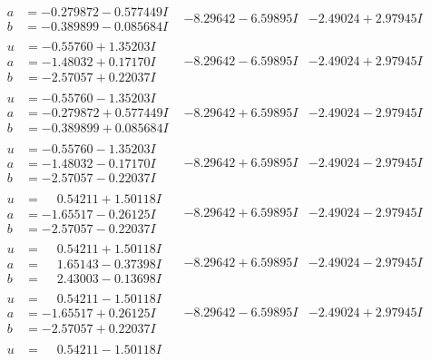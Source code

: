 \documentclass[1p]{elsarticle_modified}
\theoremstyle{definition}
\begin{document}
$$\begin{array}{c|c|c}
\begin{aligned}
a &= -0.279872 - 0.577449 I \\
b &= -0.389899 - 0.085684 I\end{aligned}
 & -8.29642 - 6.59895 I & -2.49024 + 2.97945 I \\ \hline\begin{aligned}
u &= -0.55760 + 1.35203 I \\
a &= -1.48032 + 0.17170 I \\
b &= -2.57057 + 0.22037 I\end{aligned}
 & -8.29642 - 6.59895 I & -2.49024 + 2.97945 I \\ \hline\begin{aligned}
u &= -0.55760 - 1.35203 I \\
a &= -0.279872 + 0.577449 I \\
b &= -0.389899 + 0.085684 I\end{aligned}
 & -8.29642 + 6.59895 I & -2.49024 - 2.97945 I \\ \hline\begin{aligned}
u &= -0.55760 - 1.35203 I \\
a &= -1.48032 - 0.17170 I \\
b &= -2.57057 - 0.22037 I\end{aligned}
 & -8.29642 + 6.59895 I & -2.49024 - 2.97945 I \\ \hline\begin{aligned}
u &= \phantom{-}0.54211 + 1.50118 I \\
a &= -1.65517 - 0.26125 I \\
b &= -2.57057 - 0.22037 I\end{aligned}
 & -8.29642 + 6.59895 I & -2.49024 - 2.97945 I \\ \hline\begin{aligned}
u &= \phantom{-}0.54211 + 1.50118 I \\
a &= \phantom{-}1.65143 - 0.37398 I \\
b &= \phantom{-}2.43003 - 0.13698 I\end{aligned}
 & -8.29642 + 6.59895 I & -2.49024 - 2.97945 I \\ \hline\begin{aligned}
u &= \phantom{-}0.54211 - 1.50118 I \\
a &= -1.65517 + 0.26125 I \\
b &= -2.57057 + 0.22037 I\end{aligned}
 & -8.29642 - 6.59895 I & -2.49024 + 2.97945 I \\ \hline\begin{aligned}
u &= \phantom{-}0.54211 - 1.50118 I \\

\end{aligned}
\end{array}$$
\end{document}
